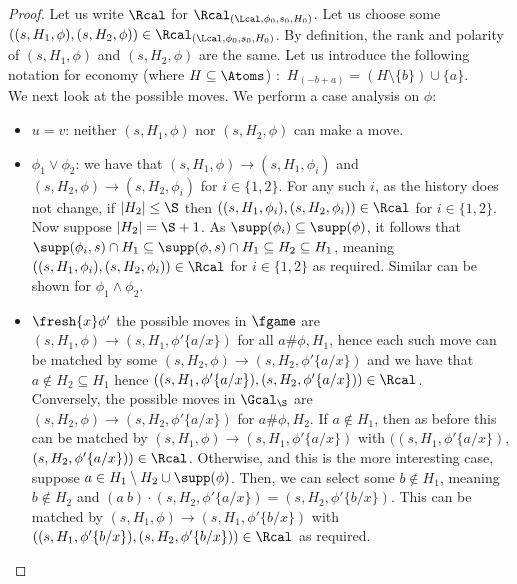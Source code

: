 \boundingisnombisim*
\begin{proof}
  Let us write $\Rcal$ for $\Rcal_{(\Lcal, \phi_0, s_0, H_0)}$.
Let us choose some $((s, H_1, \phi),(s, H_2, \phi)) \in \Rcal_{(\Lcal, \phi_0, s_0, H_0)}$. By definition, the rank and polarity of $(s, H_1, \phi)$ and $(s, H_2, \phi)$ are the same.
        Let us introduce the following notation for economy (where $ H \subseteq \Atoms$) :\
        $ H_{(-b+a)} = ( H \setminus \{b\}) \cup \{a\}$.\\
        We next look at the possible moves.
We perform a case analysis on $\phi$:
    \begin{itemize}
        \item $u = v$: neither $(s, H_1, \phi)$ nor $(s, H_2, \phi)$ can make a move.
                        \item $\phi_1 \lor \phi_2$: we have that $(s, H_1, \phi) \rightarrow (s, H_1, \phi_i)$ and $(s, H_2, \phi) \rightarrow (s, H_2, \phi_i)$ for $i \in \{1, 2\}$. 
        For any such $i$, as the history does not change, if $|H_2| \le \S $ then $((s, H_1, \phi_i), (s, H_2, \phi_i)) \in \Rcal$ for $i \in \{1,2\}$. 
        Now suppose $|H_2| = \S + 1$. 
        As $\supp(\phi_i) \subseteq \supp(\phi)$, it follows that $\supp(\phi_i, s) \cap H_1 \subseteq \supp(\phi, s) \cap H_1 \subseteq H_2 \subseteq H_1$, meaning $((s, H_1, \phi_i),(s, H_2, \phi_i)) \in \Rcal$ for $i \in \{1,2\}$ as required.
        Similar can be shown for $\phi_1 \land \phi_2$.
                \item $\fresh{x} \phi'$ the possible moves in $\fgame$ are $(s, H_1, \phi)\rightarrow (s, H_1, \phi'\{a/x\})$ for all $a \# \phi,H_1$, hence each such move can be matched by some $(s, H_2, \phi) \rightarrow (s, H_2, \phi'\{a/x\})$ and we have that $a \notin H_2 \subseteq H_1$ hence $((s, H_1, \phi'\{a/x\}),(s, H_2, \phi'\{a/x\})) \in \Rcal$. 
        \\
        Conversely, the possible moves in $\Gcal_\S$ are $(s, H_2, \phi) \rightarrow (s, H_2, \phi'\{a/x\})$ for $a \# \phi,H_2$. 
        If $a \notin H_1$, then as before this can be matched by $(s, H_1, \phi)\rightarrow (s, H_1, \phi'\{a/x\})$ with $((s, H_1, \phi'\{a/x\})$, $(s, H_2, \phi'\{a/x\})) \in \Rcal$.
        Otherwise, {and this is the more interesting case}, suppose $a \in H_1 \setminus H_2\cup\supp(\phi)$.
Then, we can select some $b \notin H_1$, meaning $b \notin H_2$ and $(a\ b)\cdot (s, H_2, \phi'\{a/x\}) = (s, H_2, \phi'\{b/x\})$. This can be matched by $(s, H_1, \phi) \rightarrow (s, H_1, \phi'\{b/x\})$ with $((s, H_1, \phi'\{b/x\}), (s, H_2, \phi'\{b/x\})) \in \Rcal$ as required. 

\end{itemize}
\end{proof}
